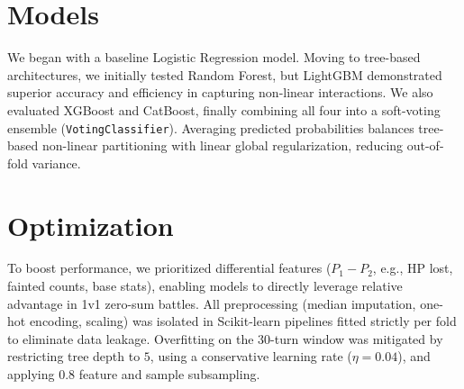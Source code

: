 \section{Models}
\label{sec:models}
We began with a baseline Logistic Regression model. Moving to tree-based architectures, we initially tested Random Forest, but LightGBM demonstrated superior accuracy and efficiency in capturing non-linear interactions. We also evaluated XGBoost and CatBoost, finally combining all four into a soft-voting ensemble (\texttt{VotingClassifier}). Averaging predicted probabilities balances tree-based non-linear partitioning with linear global regularization, reducing out-of-fold variance.

\section{Optimization}
\label{sec:optimization}
To boost performance, we prioritized differential features ($P_1 - P_2$, e.g., HP lost, fainted counts, base stats), enabling models to directly leverage relative advantage in 1v1 zero-sum battles. All preprocessing (median imputation, one-hot encoding, scaling) was isolated in Scikit-learn pipelines fitted strictly per fold to eliminate data leakage. Overfitting on the 30-turn window was mitigated by restricting tree depth to $5$, using a conservative learning rate ($\eta = 0.04$), and applying $0.8$ feature and sample subsampling.